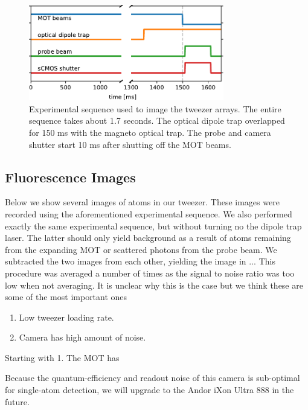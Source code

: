\begin{figure}
    \centering
    \includegraphics[width=0.76\textwidth]{figures/Sequence.pdf}
    \caption{Experimental sequence used to image the tweezer arrays. The entire sequence takes about 1.7 seconds. 
    The optical dipole trap overlapped for 150 ms with the magneto optical trap. 
    The probe and camera shutter start 10 ms after shutting off the MOT beams.}
    \label{fig:Sequence}
\end{figure}

\subsection{Fluorescence Images}

Below we show several images of atoms in our tweezer. 
These images were recorded using the aforementioned experimental sequence. 
We also performed exactly the same experimental sequence, but without turning no the dipole trap laser. 
The latter should only yield background as a result of atoms remaining from the expanding MOT or scattered photons from the probe beam. 
We subtracted the two images from each other, yielding the image in ...
This procedure was averaged a number of times as the signal to noise ratio was too low when not averaging. 
It is unclear why this is the case but we think these are some of the most important ones

\begin{enumerate}
    \item Low tweezer loading rate. 
    \item Camera has high amount of noise. 
\end{enumerate}

Starting with 1. The MOT has 




Because the quantum-efficiency and readout noise of this camera is sub-optimal for single-atom detection, we will upgrade to the Andor iXon Ultra 888 in the future. 





